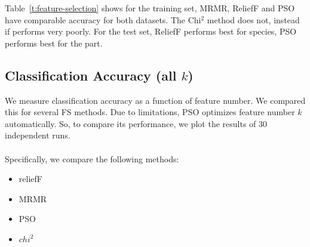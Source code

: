 \documentclass[runningheads]{llncs}
\begin{document}
Table~\ref{t:feature-selection} shows for the training set, MRMR, ReliefF and PSO have comparable accuracy for both datasets.
The Chi$^2$ method does not, instead if performs very poorly.
For the test set, ReliefF performs best for species, PSO performs best for the part.

\subsection{Classification Accuracy (all $k$)}

We measure classification accuracy as a function of feature number.
We compared this for several FS methods.
Due to limitations, PSO optimizes feature number $k$ automatically.
So, to compare its performance, we plot the results of 30 independent runs.
\\\\
Specifically, we compare the following methods:

\begin{itemize}
  \item reliefF \cite{aizerman1964theoretical}
  \item MRMR \cite{ding2005minimum}
  \item PSO \cite{kennedy1995particle,kennedy1997discrete}
  \item $chi^2$ \cite{liu1995chi2}
\end{itemize}
\end{document}

